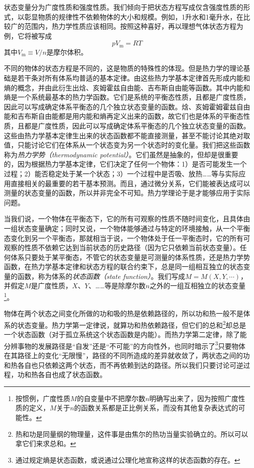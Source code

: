 \documentclass[main.tex]{subfiles}
\begin{document}
状态变量分为广度性质和强度性质。我们倾向于把状态方程写成仅含强度性质的形式，以彰显物质的规律性不依赖物体的大小和规模。例如，1升水和1毫升水，在比较广的范围内，热力学性质应该相同。按照这种喜好，再以理想气体状态方程为例，它将被写成
\[pV_\text{m}=RT\]
其中$V_\text{m}\equiv V/n$是摩尔体积。

不同的物体的状态方程是不同的，这是物质的特殊性的体现。但是热力学的理论基础是若干条对所有体系均普适的基本定律。由这些热力学基本定律首先形成内能和熵的概念，并由此衍生出焓、亥姆霍兹自由能、吉布斯自由能等函数。其中内能和熵是一个系统最基本的热力学函数。它们是系统的平衡态性质，且都是广度性质，因此可以写成确定体系平衡态的几个独立状态变量的函数。焓、亥姆霍姆霍兹自由能和吉布斯自由能都是用内能和熵再定义出来的函数，故它们也是体系的平衡态性质，且都是广度性质，因此可以写成确定体系平衡态的几个独立状态变量的函数。这些由热力学基本定律生出来的状态函数都不能直接测量，甚至不能讨论其绝对取值，只能讨论它们在体系从一个状态变为另一个状态时的变化量。我们把这些函数称为\emph{热力学势（thermodynamic potential）}。它们虽然是抽象的，但却是很重要的，因为根据热力学基本定律，它们决定了任何一个物体：1）是否可能发生一个过程；2）能否稳定处于某一个状态；3）一个过程中是否吸、放热……等与实际应用直接相关的最重要的若干基本预测。而且，通过微分关系，它们能被表达成可以测量的状态变量的函数，所以并非完全不可知。热力学理论于是才能够应用于实际问题。

当我们说，一个物体在平衡态下，它的所有可观察的性质不随时间变化，且具体由一组状态变量确定；同时又说，一个物体能够通过与特定的环境接触，从一个平衡态变化到另一个平衡态，那就相当于说，一个物体处于任一平衡态时，它的所有可观察的性质不依赖它达到当前状态的历史路径（因为它只依赖当前状态变量）。任何体系只要处于某平衡态，不管它的状态变量是可测量的体系性质，还是热力学势函数，在热力学基本定律和状态方程的联合约束下，总是同一组相互独立的状态变量的函数，称为体系的\emph{状态函数（state function）}。我们写成$M=M\left(X,Y,\cdots\right)$，并假定$M$是广度性质，$X$、$Y$、……等是除摩尔数$n$之外的一组互相独立的状态变量\footnote{按惯例，广度性质$M$的自变量中不把摩尔数$n$明确写出来了，因为按照广度性质的定义，$M$关于$n$的函数关系都是正比例关系，而没有其他复杂表达式的可能性。}。

物体在两个状态之间变化所做的功和吸的热是依赖路径的，所以功和热一般不是体系的状态变量。热力学第一定律说，就算功和热依赖路径，但它们的总和\footnote{热和功是同量纲的物理量，这件事是由焦尔的热功当量实验确立的。所以可以拿它们来求总和。}却总是一个状态函数（对于孤立系统这个状态函数是内能）。而热力学第二定律，除了能分辨事物的发展路径是“自发”还是“不可能”的方向性外，也同时暗示了\footnote{通过规定熵是状态函数，或说通过公理化地宣称这样的状态函数的存在。}只要物体在其路径上的变化“无限慢”，路径的不同所造成的差异就收敛了，两状态之间的功和热各自也只依赖这两个状态，而不再依赖到达的路径。所以我们只要讨论可逆过程，功和热各自也成了状态函数。
\end{document}
